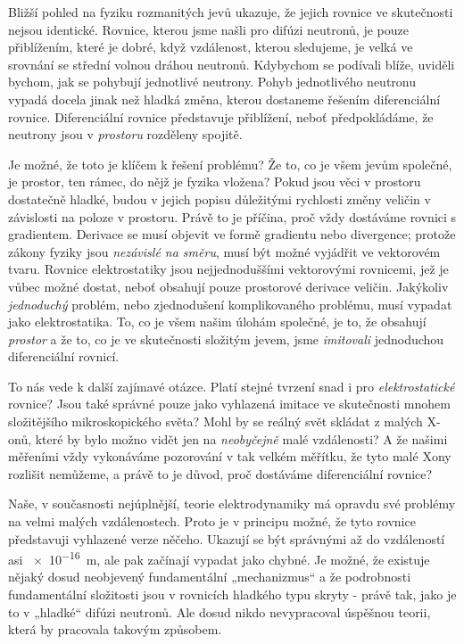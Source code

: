     Bližší pohled na fyziku rozmanitých jevů ukazuje, že jejich rovnice ve skutečnosti nejsou
    identické. Rovnice, kterou jsme našli pro difúzi neutronů, je pouze přiblížením, které je dobré,
    když vzdálenost, kterou sledujeme, je velká ve srovnání se střední volnou dráhou neutronů.
    Kdybychom se podívali blíže, uviděli bychom, jak se pohybují jednotlivé neutrony. Pohyb
    jednotlivého neutronu vypadá docela jinak než hladká změna, kterou dostaneme řešením
    diferenciální rovnice. Diferenciální rovnice představuje přiblížení, neboť předpokládáme, že
    neutrony jsou v \emph{prostoru} rozděleny spojitě.
    
    Je možné, že toto je klíčem k řešení problému? Že to, co je všem jevům společné, je prostor, ten
    rámec, do nějž je fyzika vložena? Pokud jsou věci v prostoru dostatečně hladké, budou v jejich
    popisu důležitými rychlosti změny veličin v závislosti na poloze v prostoru. Právě to je
    příčina, proč vždy dostáváme rovnici s gradientem. Derivace se musí objevit ve formě gradientu
    nebo divergence; protože zákony fyziky jsou \emph{nezávislé na směru}, musí být možné vyjádřit
    ve vektorovém tvaru. Rovnice elektrostatiky jsou nejjednoduššími vektorovými rovnicemi, jež je
    vůbec možné dostat, neboť obsahují pouze prostorové derivace veličin. Jakýkoliv
    \emph{jednoduchý} problém, nebo zjednodušení komplikovaného problému, musí vypadat jako
    elektrostatika. To, co je všem našim úlohám společné, je to, že obsahují \emph{prostor} a že to,
    co je ve skutečnosti složitým jevem, jsme \emph{imitovali} jednoduchou diferenciální rovnicí.
    
    To nás vede k další zajímavé otázce. Platí stejné tvrzení snad i pro \emph{elektrostatické}
    rovnice? Jsou také správné pouze jako vyhlazená imitace ve skutečnosti mnohem složitějšího
    mikroskopického světa? Mohl by se reálný svět skládat z malých X-onů, které by bylo možno vidět
    jen na \emph{neobyčejně} malé vzdálenosti? A že našimi měřeními vždy vykonáváme pozorování v tak
    velkém měřítku, že tyto malé Xony rozlišit nemůžeme, a právě to je důvod, proč dostáváme
    diferenciální rovnice?
    
    Naše, v současnosti nejúplnější, teorie elektrodynamiky má opravdu své problémy na velmi malých
    vzdálenostech. Proto je v principu možné, že tyto rovnice představuji vyhlazené verze něčeho.
    Ukazují se být správnými až do vzdáleností asi \SI{e-16}{\m}, ale pak začínají vypadat jako
    chybné. Je možné, že existuje nějaký dosud neobjevený fundamentální „mechanizmus“ a že
    podrobnosti fundamentální složitosti jsou v rovnicích hladkého typu skryty - právě tak, jako je
    to v „hladké“ difúzi neutronů. Ale dosud nikdo nevypracoval úspěšnou teorii, která by pracovala
    takovým způsobem.
    
